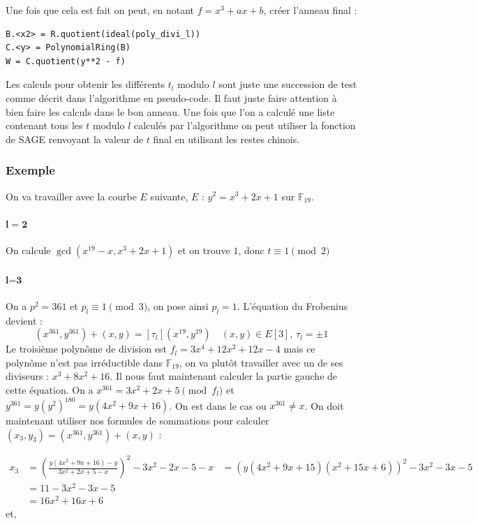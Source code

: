 \documentclass[12pt]{article}
\begin{document}
Une fois que cela est fait on peut, en notant $f=x^3 +ax+b$, créer l'anneau final :
\bigskip
\begin{lstlisting}
B.<x2> = R.quotient(ideal(poly_divi_l))
C.<y> = PolynomialRing(B)
W = C.quotient(y**2 - f)
\end{lstlisting}
\bigskip
Les calculs pour obtenir les différents $t_l$ modulo $l$ sont juste une succession de test comme décrit dans l'algorithme en pseudo-code. Il faut juste faire attention à bien faire les calculs dans le bon anneau.
Une fois que l'on a calculé une liste  contenant tous les $t$ modulo $l$ calculés par l'algorithme on peut utiliser la fonction de SAGE  renvoyant la valeur de $t$ final en utilisant les restes chinois.
\subsubsection{Exemple}
On va travailler avec la courbe $E$ suivante, $E$ : $y^2 =x^3 +2x+1$ sur $\mathbb{F}_{19}$.

\paragraph{$\mathbf{l=2}$}
On calcule $\gcd(x^{19} -x, x^3 + 2x+1)$ et on trouve $1$, donc $t \equiv 1 \pmod 2$

\paragraph{$\textbf{l=3}$}
On a $p^2 = 361$ et $p_l \equiv 1 \pmod 3$, on pose ainsi $p_l = 1$. L'équation du Frobenius devient : 
\begin{equation}
(x^{361}, y^{361}) + (x,y) = [\tau_l](x^{19}, y^{19})  \quad (x,y) \in E[3], \, \tau_l = \pm 1
\end{equation}
Le troisième polynôme de division est $f_l = 3x^4 + 12x^2 +12x - 4$ mais ce polynôme n'est pas irréductible dans $\mathbb{F}_{19}$, on va plutôt travailler avec un de ses diviseurs : $x^3 + 8x^2+16$.
\newline 
Il nous faut maintenant calculer la partie gauche de cette équation.
On a $x^{361} = 3x^2 +2x +5 \pmod f_{l}$ et $y^{361} = y(y^2)^{180} = y(4x^2+9x+16)$. On est dans le cas ou $x^{361} \ne x$. On doit maintenant utiliser nos formules de sommations pour calculer $(x_3, y_3) =(x^{361}, y^{361}) + (x,y)$ : 

\begin{align*}
x_3 &= (\frac{y(4x^2+9x+16) - y}{3x^2 +2x +5 - x})^2 -3x^2 -2x - 5 - x 
 	&= (y(4x^2+9x+15)(x^2+15x+6))^2 -3x^2 -3x - 5 \\
 	&= 11 - 3x^2 -3x - 5  \\
 	&= 16x^2 + 16x + 6 
\end{align*}
et, 
\end{document}

